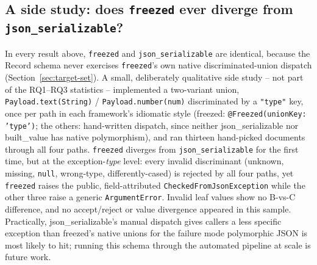 \subsection{A side study: does \texttt{freezed} ever diverge from \texttt{json\_serializable}?}
\label{sec:evaluation-union}
In every result above, \texttt{freezed} and \texttt{json\_serializable} are
identical, because the Record schema never exercises \texttt{freezed}'s own
native discriminated-union dispatch (Section~\ref{sec:target-set}). A small,
deliberately qualitative side study -- not part of the RQ1--RQ3 statistics
-- implemented a two-variant union, \texttt{Payload.text(String)} /
\texttt{Payload.number(num)} discriminated by a \texttt{"type"} key, once
per path in each framework's idiomatic style (freezed:
\texttt{@Freezed(unionKey: 'type')}; the others: hand-written dispatch,
since neither json\_serializable nor built\_value has native polymorphism),
and ran thirteen hand-picked documents through all four paths.
\texttt{freezed} diverges from \texttt{json\_serializable} for the first
time, but at the exception-\emph{type} level: every invalid discriminant
(unknown, missing, \texttt{null}, wrong-type, differently-cased) is rejected
by all four paths, yet \texttt{freezed} raises the public, field-attributed
\texttt{CheckedFromJsonException} while the other three raise a generic
\texttt{ArgumentError}. Invalid leaf values show no B-vs-C difference, and
no accept/reject or value divergence appeared in this sample. Practically,
json\_serializable's manual dispatch gives callers a less specific exception
than freezed's native unions for the failure mode polymorphic JSON is most
likely to hit; running this schema through the automated pipeline at scale
is future work.

